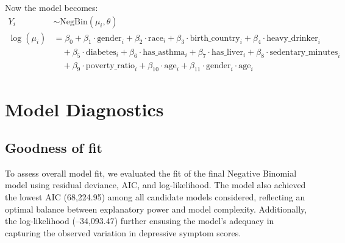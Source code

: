 \documentclass[
  11pt,
]{article}
\begin{document}
Now the model becomes:
\begin{align*}
Y_i &\sim \text{NegBin}(\mu_i, \theta) \\
\log(\mu_i) &= \beta_0 
+ \beta_1 \cdot \text{gender}_i 
+ \beta_2 \cdot \text{race}_i 
+ \beta_3 \cdot \text{birth\_country}_i 
+ \beta_4 \cdot \text{heavy\_drinker}_i \\
&\quad + \beta_5 \cdot \text{diabetes}_i 
+ \beta_6 \cdot \text{has\_asthma}_i 
+ \beta_7 \cdot \text{has\_liver}_i 
+ \beta_8 \cdot \text{sedentary\_minutes}_i \\
&\quad + \beta_9 \cdot \text{poverty\_ratio}_i 
+ \beta_{10} \cdot \text{age}_i 
+ \beta_{11} \cdot \text{gender}_i \cdot \text{age}_i
\end{align*}

\section{Model Diagnostics}\label{model-diagnostics}

\subsection{Goodness of fit}\label{goodness-of-fit}

To assess overall model fit, we evaluated the fit of the final Negative Binomial model using residual deviance, AIC, and log-likelihood. The model also achieved the lowest AIC (68,224.95) among all candidate models considered, reflecting an optimal balance between explanatory power and model complexity. Additionally, the log-likelihood (--34,093.47) further ensusing the model's adequacy in capturing the observed variation in depressive symptom scores.

\newpage

\begin{table}[!h]
\centering
\caption{\label{tab:goodfit}Model Fit Statistics for Negative Binomial Regression}
\centering
{}
\end{table}
\end{document}
